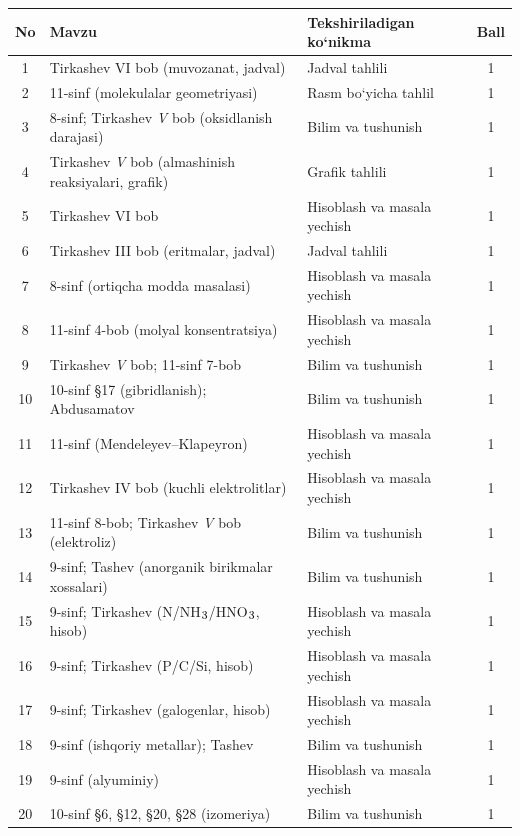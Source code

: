 \documentclass[11pt,a4paper]{article}
\renewcommand{\textsubscript}[1]{\ensuremath{_{\text{\fontsize{8}{8}\selectfont #1}}}}
\begin{document}
{\small\noindent\begin{longtable}{|c|p{7.2cm}|p{5.4cm}|c|}\hline \textbf{No} & \textbf{Mavzu} & \textbf{Tekshiriladigan ko`nikma} & \textbf{Ball}\\\hline
1 & Tirkashev VI bob (muvozanat, jadval) & Jadval tahlili & 1\\\hline
2 & 11-sinf (molekulalar geometriyasi) & Rasm bo`yicha tahlil & 1\\\hline
3 & 8-sinf; Tirkashev \textit{V} bob (oksidlanish darajasi) & Bilim va tushunish & 1\\\hline
4 & Tirkashev \textit{V} bob (almashinish reaksiyalari, grafik) & Grafik tahlili & 1\\\hline
5 & Tirkashev VI bob & Hisoblash va masala yechish & 1\\\hline
6 & Tirkashev III bob (eritmalar, jadval) & Jadval tahlili & 1\\\hline
7 & 8-sinf (ortiqcha modda masalasi) & Hisoblash va masala yechish & 1\\\hline
8 & 11-sinf 4-bob (molyal konsentratsiya) & Hisoblash va masala yechish & 1\\\hline
9 & Tirkashev \textit{V} bob; 11-sinf 7-bob & Bilim va tushunish & 1\\\hline
10 & 10-sinf \S{}17 (gibridlanish); Abdusamatov & Bilim va tushunish & 1\\\hline
11 & 11-sinf (Mendeleyev--Klapeyron) & Hisoblash va masala yechish & 1\\\hline
12 & Tirkashev IV bob (kuchli elektrolitlar) & Hisoblash va masala yechish & 1\\\hline
13 & 11-sinf 8-bob; Tirkashev \textit{V} bob (elektroliz) & Bilim va tushunish & 1\\\hline
14 & 9-sinf; Tashev (anorganik birikmalar xossalari) & Bilim va tushunish & 1\\\hline
15 & 9-sinf; Tirkashev (N/NH\textsubscript{3}/HNO\textsubscript{3}, hisob) & Hisoblash va masala yechish & 1\\\hline
16 & 9-sinf; Tirkashev (P/C/Si, hisob) & Hisoblash va masala yechish & 1\\\hline
17 & 9-sinf; Tirkashev (galogenlar, hisob) & Hisoblash va masala yechish & 1\\\hline
18 & 9-sinf (ishqoriy metallar); Tashev & Bilim va tushunish & 1\\\hline
19 & 9-sinf (alyuminiy) & Hisoblash va masala yechish & 1\\\hline
20 & 10-sinf \S{}6, \S{}12, \S{}20, \S{}28 (izomeriya) & Bilim va tushunish & 1\\\hline

\end{longtable}}
\end{document}
